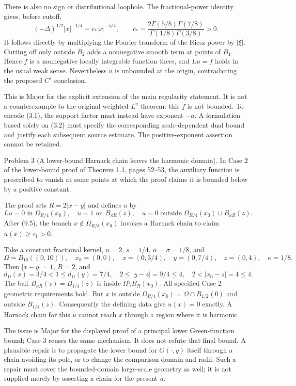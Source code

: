 \documentclass[10pt]{article}
\begin{document}
There is also no sign or distributional loophole. The fractional-power identity gives, before cutoff, \[(-\Delta)^{1/2}|x|^{-1/4}
 =c_*|x|^{-5/4},\qquad
 c_*=\frac{2\Gamma(5/8)\Gamma(7/8)}
             {\Gamma(1/8)\Gamma(3/8)}>0 .\] It follows directly by multiplying the Fourier transform of the Riesz power by \(|\xi|\). Cutting off only outside \(B_2\) adds a nonnegative smooth term at points of \(B_1\). Hence \(f\) is a nonnegative locally integrable function there, and \(Lu=f\) holds in the usual weak sense. Nevertheless \(u\) is unbounded at the origin, contradicting the proposed \(C^s\) conclusion.\par
This is Major for the explicit extension of the main regularity statement. It is not a counterexample to the original weighted-\(L^q\) theorem: this \(f\) is not bounded. To encode (3.1), the support factor must instead have exponent \(-a\). A formulation based solely on (3.2) must specify the corresponding scale-dependent dual bound and justify each subsequent source estimate. The positive-exponent assertion cannot be retained.\par
Problem 3 (A lower-bound Harnack chain leaves the harmonic domain).  In Case 2 of the lower-bound proof of Theorem 1.1, pages 52–53, the auxiliary function is prescribed to vanish at some points at which the proof claims it is bounded below by a positive constant.\par
The proof sets \(R=2|x-y|\) and defines \(u\) by \[Lu=0\text{ in }\Omega_{R/4}(x_0),\quad
 u=1\text{ on }B_{\kappa R}(z),\quad
 u=0\text{ outside }\Omega_{R/4}(x_0)\cup B_{\kappa R}(z).\] After (9.5), the branch \(x\notin\Omega_{R/8}(x_0)\) invokes a Harnack chain to claim \(u(x)\ge c_1>0\).\par
Take a constant fractional kernel, \(n=2\), \(s=1/4\), \(\alpha=\sigma=1/8\), and \[\Omega=B_{10}((0,10)),\quad x_0=(0,0),\quad
 x=(0,3/4),\quad y=(0,7/4),\quad z=(0,4),\quad\kappa=1/8 .\] Then \(|x-y|=1\), \(R=2\), and \[d_\Omega(x)=3/4<1\le d_\Omega(y)=7/4,\quad
 2\le|y-z|=9/4\le4,\quad 2<|x_0-z|=4\le4.\] The ball \(B_{\kappa R}(z)=B_{1/4}(z)\) is inside \(\Omega\setminus B_R(x_0)\). All specified Case 2 geometric requirements hold. But \(x\) is outside \(\Omega_{R/4}(x_0)=\Omega\cap B_{1/2}(0)\) and outside \(B_{1/4}(z)\). Consequently the defining data give \(u(x)=0\) exactly. A Harnack chain for this \(u\) cannot reach \(x\) through a region where it is harmonic.\par
The issue is Major for the displayed proof of a principal lower Green-function bound; Case 3 reuses the same mechanism. It does not refute that final bound. A plausible repair is to propagate the lower bound for \(G(\cdot,y)\) itself through a chain avoiding its pole, or to change the comparison domain and radii. Such a repair must cover the bounded-domain large-scale geometry as well; it is not supplied merely by asserting a chain for the present \(u\).\par
\end{document}
